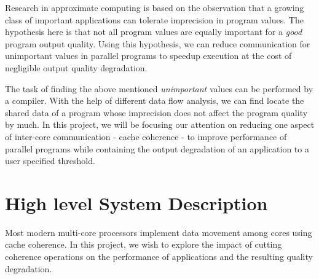 \documentclass[12pt,conference]{IEEEtran}
\begin{document}
Research in approximate computing is based on the observation that
a growing class of important applications can tolerate imprecision in 
program values. The hypothesis here is that not all program values
are equally important for a \emph{good} program output quality. Using
this hypothesis, we can reduce communication for unimportant values in 
parallel programs to speedup execution at the cost of negligible output
quality degradation.

The task of finding the above mentioned \emph{unimportant} values can be performed
by a compiler. With the help of different data flow analysis, we can 
find locate the shared data of a program whose imprecision does not
affect the program quality by much. In this project, we will be focusing 
our attention on reducing one aspect of inter-core communication - cache
coherence - to improve performance of parallel programs while containing 
the output degradation of an application to a user specified threshold.

%

\section{High level System Description}

Most modern multi-core processors implement data movement among cores
using cache coherence. In this project, we wish to explore the impact 
of cutting
coherence operations on the performance of applications and the 
resulting quality degradation. 
\end{document}
